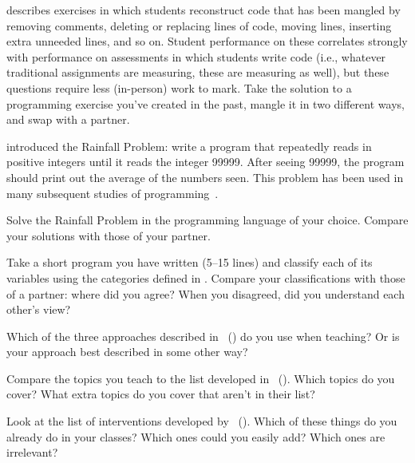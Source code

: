 \cite{Chen2017} describes exercises in which students reconstruct
code that has been mangled by removing comments, deleting or replacing
lines of code, moving lines, inserting extra unneeded lines, and so on.
Student performance on these correlates strongly with performance on
assessments in which students write code (i.e., whatever traditional
assignments are measuring, these are measuring as well), but these
questions require less (in-person) work to mark. Take the solution to a
programming exercise you've created in the past, mangle it in two
different ways, and swap with a partner.


\cite{Solo1986} introduced the Rainfall Problem: write a program that
repeatedly reads in positive integers until it reads the integer 99999.
After seeing 99999, the program should print out the average of the
numbers seen. This problem has been used in many subsequent studies of
programming~\cite{Fisl2014,Simo2013,Sepp2015}.

Solve the Rainfall Problem in the programming language of your choice.
Compare your solutions with those of your partner.


Take a short program you have written (5--15 lines) and classify each of
its variables using the categories defined in
. Compare your classifications with those
of a partner: where did you agree? When you disagreed, did you
understand each other's view?


Which of the three approaches described in~\cite{Sorv2014}
() do you use when teaching? Or is your approach
best described in some other way?


Compare the topics you teach to the list developed in~\cite{Luxt2017}
(). Which topics do you cover? What extra topics
do you cover that aren't in their list?


Look at the list of interventions developed by~\cite{Viha2014}
(). Which of these things do you already do in
your classes? Which ones could you easily add? Which ones are
irrelevant?


